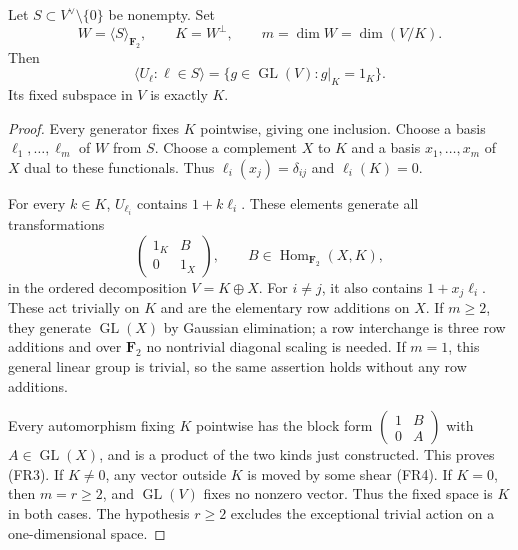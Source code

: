 \begin{lemma}
\label{lem:root-full-radicals-pointwise-stabilizer}
Let \(S\subset V^\vee\setminus\{0\}\) be nonempty. Set
\[
 W=\langle S\rangle_{\mathbf F_2},\qquad K=W^\perp,
 \qquad m=\dim W=\dim(V/K).
 \tag{FR2}
\]
Then
\[
 \langle U_\ell:\ell\in S\rangle
   =\{g\in\operatorname{GL}(V):g|_K=1_K\}.
 \tag{FR3}
\]
Its fixed subspace in \(V\) is exactly \(K\).
\end{lemma}
\begin{proof}
Every generator fixes \(K\) pointwise, giving one inclusion.
Choose a basis \(\ell_1,\ldots,\ell_m\) of \(W\) from \(S\).
Choose a complement \(X\) to \(K\) and a basis
\(x_1,\ldots,x_m\) of \(X\) dual to these functionals.
Thus \(\ell_i(x_j)=\delta_{ij}\) and \(\ell_i(K)=0\).

For every \(k\in K\), \(U_{\ell_i}\) contains
\(1+k\ell_i\). These elements generate all transformations
\[
 \begin{pmatrix}1_K&B\\0&1_X\end{pmatrix},
 \qquad B\in\operatorname{Hom}_{\mathbf F_2}(X,K),
 \tag{FR4}
\]
in the ordered decomposition \(V=K\oplus X\).
For \(i\ne j\), it also contains \(1+x_j\ell_i\).
These act trivially on \(K\) and are the elementary row additions
on \(X\). If \(m\geq2\), they generate
\(\operatorname{GL}(X)\) by Gaussian elimination; a row interchange
is three row additions and over \(\mathbf F_2\) no nontrivial
diagonal scaling is needed. If \(m=1\), this general linear group
is trivial, so the same assertion holds without any row additions.

Every automorphism fixing \(K\) pointwise has the block form
\(\left(\begin{smallmatrix}1&B\\0&A\end{smallmatrix}\right)\)
with \(A\in\operatorname{GL}(X)\), and is a product of the
two kinds just constructed. This proves (FR3).
If \(K\ne0\), any vector outside \(K\) is moved by some
shear (FR4). If \(K=0\), then \(m=r\geq2\), and
\(\operatorname{GL}(V)\) fixes no nonzero vector. Thus the fixed
space is \(K\) in both cases. The hypothesis \(r\geq2\)
excludes the exceptional trivial action on a one-dimensional space.
\end{proof}

